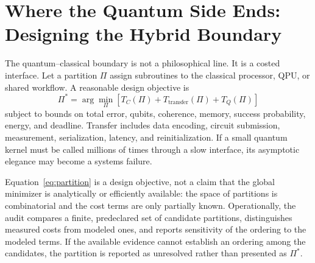 \section{Where the Quantum Side Ends: Designing the Hybrid Boundary}\label{sec:hybrid}

The quantum--classical boundary is not a philosophical line. It is a costed interface. Let a partition $\Pi$ assign subroutines to the classical processor, QPU, or shared workflow. A reasonable design objective is
\begin{equation}
\Pi^*=\arg\min_{\Pi}
\left[
T_C(\Pi)+T_{\mathrm{transfer}}(\Pi)+T_Q(\Pi)
\right]
\label{eq:partition}
\end{equation}
subject to bounds on total error, qubits, coherence, memory, success probability, energy, and deadline. Transfer includes data encoding, circuit submission, measurement, serialization, latency, and reinitialization. If a small quantum kernel must be called millions of times through a slow interface, its asymptotic elegance may become a systems failure.

Equation~\eqref{eq:partition} is a design objective, not a claim that the global minimizer is analytically or efficiently available: the space of partitions is combinatorial and the cost terms are only partially known. Operationally, the audit compares a finite, predeclared set of candidate partitions, distinguishes measured costs from modeled ones, and reports sensitivity of the ordering to the modeled terms. If the available evidence cannot establish an ordering among the candidates, the partition is reported as unresolved rather than presented as $\Pi^{*}$.

